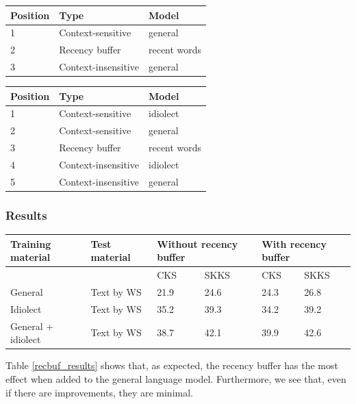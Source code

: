 \documentclass[11pt]{article}
\let\originaltable\table
\let\endoriginaltable\endtable
\renewenvironment{table}[1][ht]{%
  \originaltable[#1]
  \centering}%
  {\endoriginaltable}
\begin{document}
\begin{table}[H]
\begin{tabular}{lll} 
Position&Type&Model\\
\hline
1&Context-sensitive&general\\
2&Recency buffer&recent words\\
3&Context-insensitive&general\\
\end{tabular} 
\caption{The module order for simulation 2, with the general model and the recency buffer} 
\end{table}

\begin{table}[H]
\begin{tabular}{lll} 
Position&Type&Model\\
\hline
1&Context-sensitive&idiolect\\
2&Context-sensitive&general\\
3&Recency buffer&recent words\\
4&Context-insensitive&idiolect\\
5&Context-insensitive&general\\
\end{tabular} 
\caption{The module order for simulation 3, with the idiolect model, the general model and the recency buffer} \label{sim3}
\end{table}


\subsubsection{Results} 

\begin{table}[H] 
\centering
\begin{tabular}{ll|llll} 
Training material&Test material&\multicolumn{2}{l}{Without recency buffer}&\multicolumn{2}{l}{With recency buffer}\\
\hline
&&CKS&SKKS&CKS&SKKS\\
General&Text by WS&21.9&24.6&24.3&26.8\\
Idiolect&Text by WS&35.2&39.3&34.2&39.2\\
General + idiolect&Text by WS&38.7&42.1&39.9&42.6\\
\end{tabular} 
\caption{Percentage of keystrokes that can be saved with and without the recency buffer} \label{recbuf_results}
\end{table}

Table \ref{recbuf_results} shows that, as expected, the recency buffer has the most effect when added to the general language model. Furthermore, we see that, even if there are improvements, they are minimal.
\end{document}
